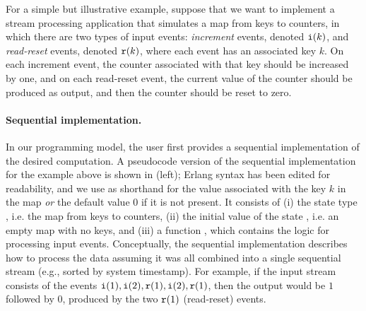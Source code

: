 For a simple but illustrative example, suppose that we want to
implement a stream processing application that simulates a map from
keys to counters, in which there are two types of input events: \emph{increment}
events, denoted $\texttt{i}(k)$, and \emph{read-reset} events, denoted
$\texttt{r}(k)$, where each event has an associated key $k$.  On each
increment event, the counter associated with that key should be
increased by one, and on each read-reset event, the current value of
the counter should be produced as output, and then the counter should be reset to
zero.

\paragraph{Sequential implementation.}
\label{dgs:p:seq-impl}
In our programming model, the user first provides a sequential
implementation of the desired computation.
A pseudocode
version of the sequential implementation for the
example above is shown in  (left);
Erlang syntax has been edited for readability, and
we use  as shorthand for the value associated with the key $k$ in the map
\emph{or} the default value $0$ if it is not present.
It consists of
(i) the state type , i.e. the map from keys to
counters, (ii) the initial value of the state ,
i.e. an empty map with no keys, and (iii) a function ,
which contains the logic for processing input events.
Conceptually, the sequential implementation describes how to process
the data assuming it was all combined into a single sequential stream (e.g.,
sorted by system timestamp).  For example, if the input stream
consists of the events $\texttt{i}(1), \texttt{i}(2), \texttt{r}(1), \texttt{i}(2),
\texttt{r}(1)$, then the output would be $1$ followed by $0$, produced by
the two $\texttt{r}(1)$ (read-reset) events.

